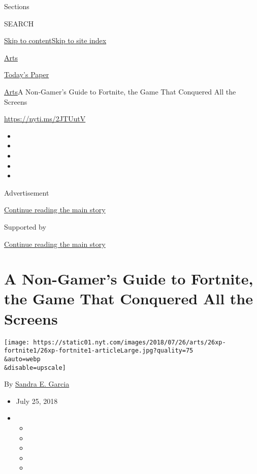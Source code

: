 Sections

SEARCH

\protect\hyperlink{site-content}{Skip to
content}\protect\hyperlink{site-index}{Skip to site index}

\href{https://www.nytimes.com/section/arts}{Arts}

\href{https://myaccount.nytimes.com/auth/login?response_type=cookie\&client_id=vi}{}

\href{https://www.nytimes.com/section/todayspaper}{Today's Paper}

\href{/section/arts}{Arts}\textbar{}A Non-Gamer's Guide to Fortnite, the
Game That Conquered All the Screens

\url{https://nyti.ms/2JTUutV}

\begin{itemize}
\item
\item
\item
\item
\item
\end{itemize}

Advertisement

\protect\hyperlink{after-top}{Continue reading the main story}

Supported by

\protect\hyperlink{after-sponsor}{Continue reading the main story}

\hypertarget{a-non-gamers-guide-to-fortnite-the-game-that-conquered-all-the-screens}{%
\section{A Non-Gamer's Guide to Fortnite, the Game That Conquered All
the
Screens}\label{a-non-gamers-guide-to-fortnite-the-game-that-conquered-all-the-screens}}

\texttt{[image: https://static01.nyt.com/images/2018/07/26/arts/26xp-fortnite1/26xp-fortnite1-articleLarge.jpg?quality=75\\\&auto=webp\\\&disable=upscale]}

By \href{https://www.nytimes.com/by/sandra-e-garcia}{Sandra E. Garcia}

\begin{itemize}
\item
  July 25, 2018
\item
  \begin{itemize}
  \item
  \item
  \item
  \item
  \item
  \end{itemize}
\end{itemize}


